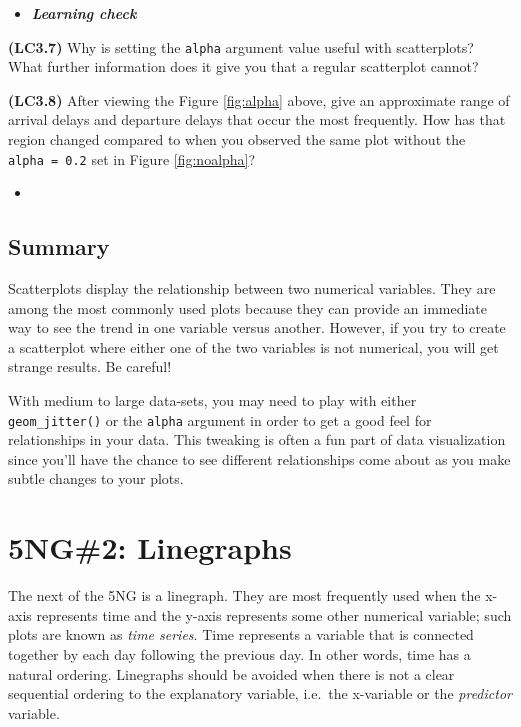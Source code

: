 \documentclass[12pt,]{krantz}
\newenvironment{rmdblock}[1]
  {\begin{shaded*}
  \begin{itemize}
  \renewcommand{\labelitemi}{
    \raisebox{-.7\height}[0pt][0pt]{
    }
  }
  \item
  }
  {
  \end{itemize}
  \end{shaded*}
  }
\newenvironment{learncheck}
  {\begin{rmdblock}{warning}}
  {\end{rmdblock}}
\theoremstyle{definition}
\theoremstyle{definition}
\theoremstyle{definition}
\theoremstyle{remark}
\begin{document}
\begin{learncheck}
\textbf{\emph{Learning check}}
\end{learncheck}

\textbf{(LC3.7)} Why is setting the \texttt{alpha} argument value useful
with scatterplots? What further information does it give you that a
regular scatterplot cannot?

\textbf{(LC3.8)} After viewing the Figure \ref{fig:alpha} above, give an
approximate range of arrival delays and departure delays that occur the
most frequently. How has that region changed compared to when you
observed the same plot without the \texttt{alpha\ =\ 0.2} set in Figure
\ref{fig:noalpha}?

\begin{learncheck}

\end{learncheck}

\subsection{Summary}\label{summary}

Scatterplots display the relationship between two numerical variables.
They are among the most commonly used plots because they can provide an
immediate way to see the trend in one variable versus another. However,
if you try to create a scatterplot where either one of the two variables
is not numerical, you will get strange results. Be careful!

With medium to large data-sets, you may need to play with either
\texttt{geom\_jitter()} or the \texttt{alpha} argument in order to get a
good feel for relationships in your data. This tweaking is often a fun
part of data visualization since you'll have the chance to see different
relationships come about as you make subtle changes to your plots.

\section{5NG\#2: Linegraphs}\label{linegraphs}

The next of the 5NG is a linegraph. They are most frequently used when
the x-axis represents time and the y-axis represents some other
numerical variable; such plots are known as \emph{time series}. Time
represents a variable that is connected together by each day following
the previous day. In other words, time has a natural ordering.
Linegraphs should be avoided when there is not a clear sequential
ordering to the explanatory variable, i.e.~the x-variable or the
\emph{predictor} variable.
\end{document}
